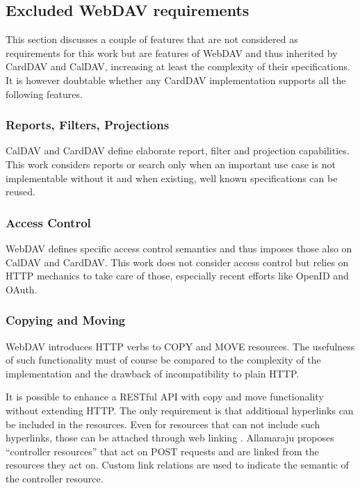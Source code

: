 \documentclass[11pt,a4paper,headsepline,twoside]{scrartcl}		%
\begin{document}
\subsection{Excluded WebDAV requirements}
\label{sec:excluded-requirements}

This section discusses a couple of features that are not considered as
requirements for this work but are features of WebDAV and thus inherited by
CardDAV and CalDAV, increasing at least the complexity of their
specifications. It is however doubtable whether any CardDAV implementation
supports all the following features.

\subsubsection{Reports, Filters, Projections}

CalDAV and CardDAV define elaborate report, filter and projection
capabilities. This work considers reports or search only when an important use
case is not implementable without it and when existing, well known
specifications can be reused.

\subsubsection{Access Control}
WebDAV defines specific access control semantics and thus imposes those also on
CalDAV and CardDAV. This work does not consider access control but relies on
HTTP mechanics to take care of those, especially recent efforts like OpenID and
OAuth. %

\subsubsection{Copying and Moving}
WebDAV introduces HTTP verbs to COPY and MOVE resources. The usefulness of such
functionality must of course be compared to the complexity of the implementation
and the drawback of incompatibility to plain HTTP.

It is possible to enhance a RESTful API with copy and move functionality without
extending HTTP. The only requirement is that additional hyperlinks can be
included in the resources. Even for resources that can not include such
hyperlinks, those can be attached through web linking \cite{RFC5988}
. Allamaraju \cite[Ch. 11]{Allamaraju_2010} proposes ``controller resources''
that act on POST requests and are linked from the resources they act on. Custom
link relations are used to indicate the semantic of the controller resource.
\end{document}
